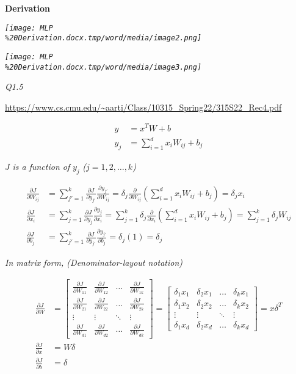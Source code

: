 \documentclass{scrbook}
\begin{document}
\pagebreak
\textbf{Derivation}

\textit{\texttt{[image: MLP\\\%20Derivation.docx.tmp/word/media/image2.png]}}

\textit{\texttt{[image: MLP\\\%20Derivation.docx.tmp/word/media/image3.png]}}

\pagebreak
\textit{Q1.5}

\url{https://www.cs.cmu.edu/~aarti/Class/10315_Spring22/315S22_Rec4.pdf}

\begin{align*}
y&=x^{T}W+b \\
y_{j}&={\sum }_{i=1}^{d}x_{i}W_{ij}+b_{j} 
\end{align*}

$J$ \textit{is a function of} $y_{j}$ \textit{(}$j=1,2,\ldots ,k$\textit{)}

\begin{align*}
\frac{\partial J}{\partial W_{ij}}&={\sum }_{j'=1}^{k}\frac{\partial J}{\partial y_{j'}}\frac{\partial y_{j'}}{\partial W_{ij}}=\delta _{j}\frac{\partial }{\partial W_{ij}}\left({\sum }_{i=1}^{d}x_{i}W_{ij}+b_{j}\right)=\delta _{j}x_{i} \\
\frac{\partial J}{\partial x_{i}}&={\sum }_{j=1}^{k}\frac{\partial J}{\partial y_{j}}\frac{\partial y_{j}}{\partial x_{i}}={\sum }_{j=1}^{k}\delta _{j}\frac{\partial }{\partial x_{i}}\left({\sum }_{i=1}^{d}x_{i}W_{ij}+b_{j}\right)={\sum }_{j=1}^{k}\delta _{j}W_{ij} \\
\frac{\partial J}{\partial b_{j}}&={\sum }_{j'=1}^{k}\frac{\partial J}{\partial y_{j'}}\frac{\partial y_{j'}}{\partial b_{j}}=\delta _{j}\left(1\right)=\delta _{j} 
\end{align*}

\textit{In matrix form, (Denominator-layout notation)}

\begin{align*}
\frac{\partial J}{\partial W}&=\begin{bmatrix}
\frac{\partial J}{\partial W_{11}} & \frac{\partial J}{\partial W_{12}} & \ldots & \frac{\partial J}{\partial W_{1k}}\\
\frac{\partial J}{\partial W_{21}} & \frac{\partial J}{\partial W_{22}} & \ldots & \frac{\partial J}{\partial W_{2k}}\\
\vdots & \vdots & \ddots & \vdots \\
\frac{\partial J}{\partial W_{d1}} & \frac{\partial J}{\partial W_{d2}} & \ldots & \frac{\partial J}{\partial W_{dk}}
\end{bmatrix}=\left[\begin{array}{cccc}
\delta _{1}x_{1} & \delta _{2}x_{1} & \ldots & \delta _{k}x_{1}\\
\delta _{1}x_{2} & \delta _{2}x_{2} & \ldots & \delta _{k}x_{2}\\
\vdots & \vdots & \ddots & \vdots \\
\delta _{1}x_{d} & \delta _{2}x_{d} & \ldots & \delta _{k}x_{d}
\end{array}\right]=x\delta ^{T} \\
\frac{\partial J}{\partial x}&=W\delta  \\
\frac{\partial J}{\partial b}&=\delta  
\end{align*}
\end{document}

